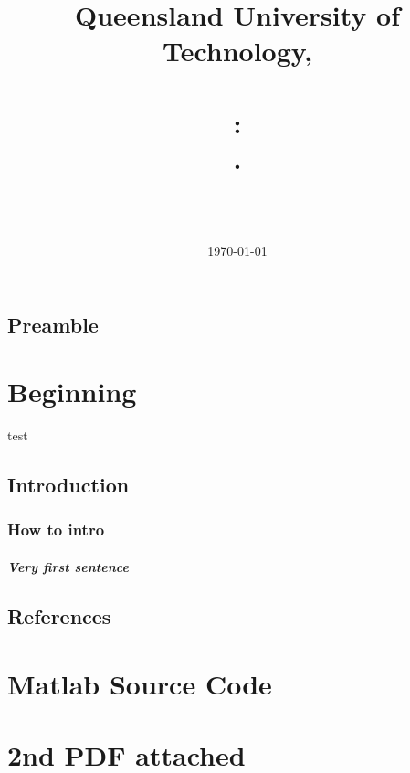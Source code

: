 \documentclass[english]{report}
\title{ Queensland University of Technology, \subjectCode \\ \HRule{1 pt} \\ \AssignmentNum : \\ \taskName.
\HRule{2.0pt} \\ [0.6cm]}
\author{\textbf{\myname} \\ \\ \mySTD }
\date{\today} %
\begin{document}
\maketitle
\pagestyle{fancy}
\tableofcontents %
\newpage
\section*{Preamble}

\chapter{Beginning} %
test \cite{australian_government_australian_nodate}
\section{Introduction} %
\subsection{How to intro}
\paragraph{Very first sentence }


\newpage
\section*{References}
\printbibliography[heading=none] %

\appendix
\chapter{Matlab Source Code}

\chapter{2nd PDF attached}
\end{document}
